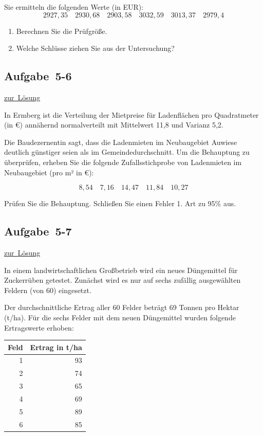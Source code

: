 \documentclass[
  11pt,
  ngerman,
  a4paper,
]{report}
\providecommand{\tightlist}{%
  \setlength{\itemsep}{0pt}\setlength{\parskip}{0pt}}
\begin{document}
Sie ermitteln die folgenden Werte (in EUR):
\[
2927{,}35\quad2930{,}68\quad2903{,}58\quad3032{,}59\quad3013{,}37\quad2979{,}4
\]

\begin{enumerate}
\def\labelenumi{\alph{enumi})}
\tightlist
\item
  Berechnen Sie die Prüfgröße.
\item
  Welche Schlüsse ziehen Sie aus der Untersuchung?
\end{enumerate}

\hypertarget{aufgabe-5-6}{%
\subsection{Aufgabe~5-6}\label{aufgabe-5-6}}

\protect\hyperlink{loesung-5-6}{zur~Lösung}

In Ermberg ist die Verteilung der Mietpreise für Ladenflächen pro Quadratmeter (in €) annähernd normalverteilt mit Mittelwert 11,8 und Varianz 5,2.

Die Baudezernentin sagt, dass die Ladenmieten im Neubaugebiet Auwiese deutlich günstiger seien als im Gemeindedurchschnitt. Um die Behauptung zu überprüfen, erheben Sie die folgende Zufallsstichprobe von Ladenmieten im Neubaugebiet (pro m² in €):

\[8{,}54\quad7{,}16\quad14{,}47\quad11{,}84\quad10{,}27\]

Prüfen Sie die Behauptung. Schließen Sie einen Fehler 1. Art zu 95\% aus.

\hypertarget{aufgabe-5-7}{%
\subsection{Aufgabe~5-7}\label{aufgabe-5-7}}

\protect\hyperlink{loesung-5-7}{zur~Lösung}

In einem landwirtschaftlichen Großbetrieb wird ein neues Düngemittel für Zuckerrüben getestet. Zunächst wird es nur auf sechs zufällig ausgewählten Feldern (von 60) eingesetzt.

Der durchschnittliche Ertrag aller 60 Felder beträgt 69 Tonnen pro Hektar (t/ha). Für die sechs Felder mit dem neuen Düngemittel wurden folgende Ertragswerte erhoben:

\begin{table}[H]
\centering
\begin{tabular}{rr}
\toprule
\textbf{Feld} & \textbf{Ertrag in t/ha}\\
\midrule
1 & 93\\
2 & 74\\
3 & 65\\
4 & 69\\
5 & 89\\
6 & 85\\
\bottomrule
\end{tabular}
\end{table}
\end{document}
